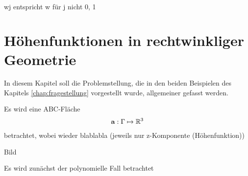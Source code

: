 \documentclass[10pt,a4paper,oneside]{report}
\newcommand{\R}{\mathbb{R}}
\begin{document}
wj entspricht w für j nicht 0, 1

\chapter{Höhenfunktionen in rechtwinkliger Geometrie}

In diesem Kapitel soll die Problemstellung, die in den beiden Beispielen des Kapitels \ref{chap:fragestellung} vorgestellt wurde, allgemeiner gefasst werden.

Es wird eine ABC-Fläche 
\begin{align*}
\bold{a}: \Gamma \mapsto \R^3
\end{align*}
betrachtet, wobei wieder blablabla
(jeweils nur z-Komponente (Höhenfunktion))

Bild

Es wird zunächst der polynomielle Fall betrachtet
\end{document}
